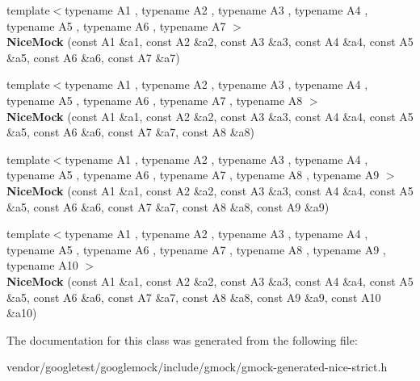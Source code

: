 \begin{DoxyCompactItemize}
\item 
{\footnotesize template$<$typename A1 , typename A2 , typename A3 , typename A4 , typename A5 , typename A6 , typename A7 $>$ }\\{\bfseries Nice\+Mock} (const A1 \&a1, const A2 \&a2, const A3 \&a3, const A4 \&a4, const A5 \&a5, const A6 \&a6, const A7 \&a7)\hypertarget{classtesting_1_1NiceMock_a946d75ece1fa3a066b7d9d6ab7828c55}{}\label{classtesting_1_1NiceMock_a946d75ece1fa3a066b7d9d6ab7828c55}

\item 
{\footnotesize template$<$typename A1 , typename A2 , typename A3 , typename A4 , typename A5 , typename A6 , typename A7 , typename A8 $>$ }\\{\bfseries Nice\+Mock} (const A1 \&a1, const A2 \&a2, const A3 \&a3, const A4 \&a4, const A5 \&a5, const A6 \&a6, const A7 \&a7, const A8 \&a8)\hypertarget{classtesting_1_1NiceMock_ae8792aab6c024a50886856bf1093eedc}{}\label{classtesting_1_1NiceMock_ae8792aab6c024a50886856bf1093eedc}

\item 
{\footnotesize template$<$typename A1 , typename A2 , typename A3 , typename A4 , typename A5 , typename A6 , typename A7 , typename A8 , typename A9 $>$ }\\{\bfseries Nice\+Mock} (const A1 \&a1, const A2 \&a2, const A3 \&a3, const A4 \&a4, const A5 \&a5, const A6 \&a6, const A7 \&a7, const A8 \&a8, const A9 \&a9)\hypertarget{classtesting_1_1NiceMock_a61cfc9282222928590bcdaf851a806c6}{}\label{classtesting_1_1NiceMock_a61cfc9282222928590bcdaf851a806c6}

\item 
{\footnotesize template$<$typename A1 , typename A2 , typename A3 , typename A4 , typename A5 , typename A6 , typename A7 , typename A8 , typename A9 , typename A10 $>$ }\\{\bfseries Nice\+Mock} (const A1 \&a1, const A2 \&a2, const A3 \&a3, const A4 \&a4, const A5 \&a5, const A6 \&a6, const A7 \&a7, const A8 \&a8, const A9 \&a9, const A10 \&a10)\hypertarget{classtesting_1_1NiceMock_a4baf1da52f4c892fc02f6ba10c0b8c02}{}\label{classtesting_1_1NiceMock_a4baf1da52f4c892fc02f6ba10c0b8c02}

\end{DoxyCompactItemize}


The documentation for this class was generated from the following file\+:\begin{DoxyCompactItemize}
\item 
vendor/googletest/googlemock/include/gmock/gmock-\/generated-\/nice-\/strict.\+h\end{DoxyCompactItemize}
